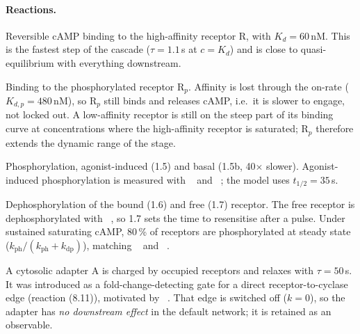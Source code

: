 \paragraph{Reactions.}
\begin{description}\itemsep0pt
\item[1.1/1.2] Reversible cAMP binding to the high-affinity receptor R, with $K_d=60$\,nM. This is the fastest step of the cascade ($\tau=1.1$\,s at $c=K_d$) and is close to quasi-equilibrium with everything downstream.
\item[1.3/1.4] Binding to the phosphorylated receptor R$_p$. Affinity is lost through the on-rate ($K_{d,p}=480$\,nM), so R$_p$ still binds and releases cAMP, i.e.\ it is slower to engage, not locked out. A low-affinity receptor is still on the steep part of its binding curve at concentrations where the high-affinity receptor is saturated; R$_p$ therefore extends the dynamic range of the stage.
\item[1.5/1.5b] Phosphorylation, agonist-induced (1.5) and basal (1.5b, 40$\times$ slower). Agonist-induced phosphorylation is measured with ~\cite{vaughan1988} and ~\cite{vaughan1988}; the model uses $t_{1/2}=35$\,s.
\item[1.6/1.7] Dephosphorylation of the bound (1.6) and free (1.7) receptor. The free receptor is dephosphorylated with ~\cite{vaughan1988}, so 1.7 sets the time to resensitise after a pulse. Under sustained saturating cAMP, 80\,\% of receptors are phosphorylated at steady state ($k_\mathrm{ph}/(k_\mathrm{ph}+k_\mathrm{dp})$), matching ~\cite{johnson1991} and ~\cite{vanhaastert1984}.
\item[1.8a/b] A cytosolic adapter A is charged by occupied receptors and relaxes with $\tau=50$\,s. It was introduced as a fold-change-detecting gate for a direct receptor-to-cyclase edge (reaction (8.11)), motivated by ~\cite{kamino2017}. That edge is switched off ($k=0$), so the adapter has \emph{no downstream effect} in the default network; it is retained as an observable.
\end{description}

